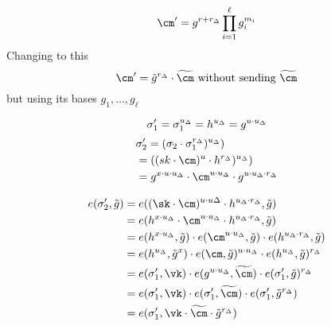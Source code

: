     \[
        \cm' = g^{r+r_\Delta} \prod_{i=1}^\ell g_i^{m_i}
    \]
    Changing to this
    \[
        \cm' = \tilde{g}^{r_\Delta} \cdot \widetilde{\cm} \text{  without sending  } \widetilde{\cm} 
    \]
    but using its bases $g_1, \ldots, g_\ell$

    \[
        \sigma_1' = \sigma_1^{u_\Delta} = h^{u_\Delta} = g^{u \cdot u_\Delta} \\
    \]
    \begin{align*}
    &\sigma_2' = (\sigma_2\cdot \sigma_1^{r_\Delta})^{u_\Delta}) \\
    &= ((sk\cdot \cm)^u \cdot h^{r_\Delta})^{u_\Delta}) \\
    &= g^{x \cdot u \cdot u_\Delta} \cdot \cm^{u \cdot u_\Delta}\cdot g^{u \cdot u_\Delta \cdot r_\Delta}\\
    \end{align*}

    \begin{align*}
    e(\sigma_2', \tilde{g}) &= e((\sk \cdot \cm)^{u \cdot u\Delta}\cdot h^{u_\Delta \cdot r_\Delta}, \tilde{g}) \\
    &= e(h^{x \cdot u_\Delta}\cdot \cm^{u \cdot u_\Delta} \cdot h^{u_\Delta \cdot r_\Delta}, \tilde{g}) \\
    &= e(h^{x \cdot u_\Delta}, \tilde{g}) \cdot e(\cm^{u \cdot u_\Delta}, \tilde{g}) \cdot e(h^{ u_\Delta \cdot r_\Delta}, \tilde{g}) \\
    &= e(h^{u_\Delta}, \tilde{g}^x) \cdot e(\cm, \tilde{g})^{u \cdot u_\Delta} \cdot e(h^{ u_\Delta}, \tilde{g})^{r_\Delta} \\
    &= e(\sigma_1', \vk) \cdot e(g^{u \cdot u_\Delta}, \widetilde{\cm}) \cdot e(\sigma_1', \tilde{g})^{r_\Delta} \\
    &= e(\sigma_1', \vk) \cdot e(\sigma_1', \widetilde{\cm}) \cdot e(\sigma_1', \tilde{g}^{r_\Delta}) \\
    &= e(\sigma_1', \vk \cdot \widetilde{\cm} \cdot \tilde{g}^{r_\Delta}) \\
\end{align*}

    
    


